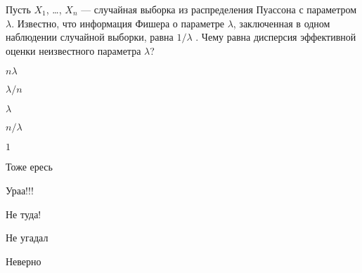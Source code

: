 
\begin{question}
Пусть \(X_1\), \ldots, \(X_n\) --- случайная выборка из распределения
Пуассона с параметром \(\lambda\). Известно, что информация Фишера о
параметре \(\lambda\), заключенная в одном наблюдении случайной выборки,
равна \(1/\lambda\) . Чему равна дисперсия эффективной оценки
неизвестного параметра \(\lambda\)?
\begin{answerlist}
  \item \(n\lambda\)
  \item \(\lambda/n\)
  \item \(\lambda\)
  \item \(n/\lambda\)
  \item \(1\)
\end{answerlist}
\end{question}

\begin{solution}
\begin{answerlist}
  \item Тоже ересь
  \item Ураа!!!
  \item Не туда!
  \item Не угадал
  \item Неверно
\end{answerlist}
\end{solution}

